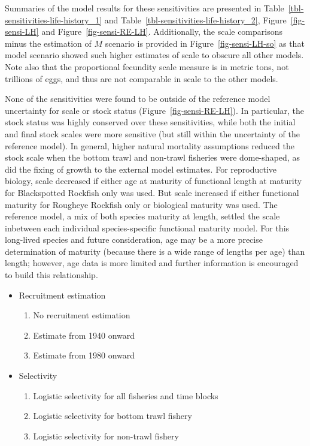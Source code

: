 \documentclass[
]{scrartcl}
\providecommand{\tightlist}{%
  \setlength{\itemsep}{0pt}\setlength{\parskip}{0pt}}\usepackage{longtable,booktabs,array}
\begin{document}
Summaries of the model results for these sensitivities are presented in
Table~\ref{tbl-sensitivities-life-history_1} and
Table~\ref{tbl-sensitivities-life-history_2}, Figure~\ref{fig-sensi-LH}
and Figure~\ref{fig-sensi-RE-LH}. Additionally, the scale comparisons
minus the estimation of \(M\) scenario is provided in
Figure~\ref{fig-sensi-LH-so} as that model scenario showed such higher
estimates of scale to obscure all other models. Note also that the
proportional fecundity scale measure is in metric tons, not trillions of
eggs, and thus are not comparable in scale to the other models.

None of the sensitivities were found to be outside of the reference
model uncertainty for scale or stock status
(Figure~\ref{fig-sensi-RE-LH}). In particular, the stock status was
highly conserved over these sensitivities, while both the initial and
final stock scales were more sensitive (but still within the uncertainty
of the reference model). In general, higher natural mortality
assumptions reduced the stock scale when the bottom trawl and non-trawl
fisheries were dome-shaped, as did the fixing of growth to the external
model estimates. For reproductive biology, scale decreased if either age
at maturity of functional length at maturity for Blackspotted Rockfish
only was used. But scale increased if either functional maturity for
Rougheye Rockfish only or biological maturity was used. The reference
model, a mix of both species maturity at length, settled the scale
inbetween each individual species-specific functional maturity model.
For this long-lived species and future consideration, age may be a more
precise determination of maturity (because there is a wide range of
lengths per age) than length; however, age data is more limited and
further information is encouraged to build this relationship.

\begin{itemize}
\item
  Recruitment estimation

  \begin{enumerate}
  \def\labelenumi{\arabic{enumi}.}
  \setcounter{enumi}{12}
  \tightlist
  \item
    No recruitment estimation
  \item
    Estimate from 1940 onward
  \item
    Estimate from 1980 onward
  \end{enumerate}
\item
  Selectivity

  \begin{enumerate}
  \def\labelenumi{\arabic{enumi}.}
  \setcounter{enumi}{15}
  \tightlist
  \item
    Logistic selectivity for all fisheries and time blocks
  \item
    Logistic selectivity for bottom trawl fishery
  \item
    Logistic selectivity for non-trawl fishery
  \end{enumerate}
\end{itemize}
\end{document}
